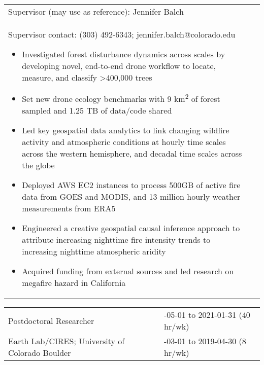 \documentclass[10pt,english]{article}
\providecommand{\tabularnewline}{\\}
\begin{document}
\renewcommand{\arraystretch}{1.2}
\begin{tabularx}{\textwidth}{@{}>{\raggedright}p{6.25in} >{\raggedleft}X@{}}
\addtolength{\leftskip}{5ex}Supervisor (may use as reference): Jennifer Balch \tabularnewline
\addtolength{\leftskip}{5ex}Supervisor contact: (303) 492-6343; jennifer.balch@colorado.edu
\begin{itemize}
\itemsep0em
\item{Investigated forest disturbance dynamics across scales by developing novel, end-to-end drone workflow to locate, measure, and classify >400,000 trees}
\item{Set new drone ecology benchmarks with 9 km\textsuperscript{2} of forest sampled and 1.25 TB of data/code shared}
\item{Led key geospatial data analytics to link changing wildfire activity and atmospheric conditions at hourly time scales across the western hemisphere, and decadal time scales across the globe}
\item{Deployed AWS EC2 instances to process 500GB of active fire data from GOES and MODIS, and 13 million hourly weather measurements from ERA5}
\item{Engineered a creative geospatial causal inference approach to attribute increasing nighttime fire intensity trends to increasing nighttime atmospheric aridity}
\item{Acquired funding from external sources and led research on megafire hazard in California}
\end{itemize}
\end{tabularx}

\renewcommand{\arraystretch}{1.2}
\begin{tabularx}{\textwidth}{@{}>{\raggedright}p{3.75in} >{\raggedleft}X@{}}
Postdoctoral Researcher & 2019-05-01 to 2021-01-31 (40 hr/wk) \tabularnewline
Earth Lab/CIRES; University of Colorado Boulder & 2019-03-01 to 2019-04-30 (8 hr/wk) \tabularnewline
\end{tabularx}
\end{document}

